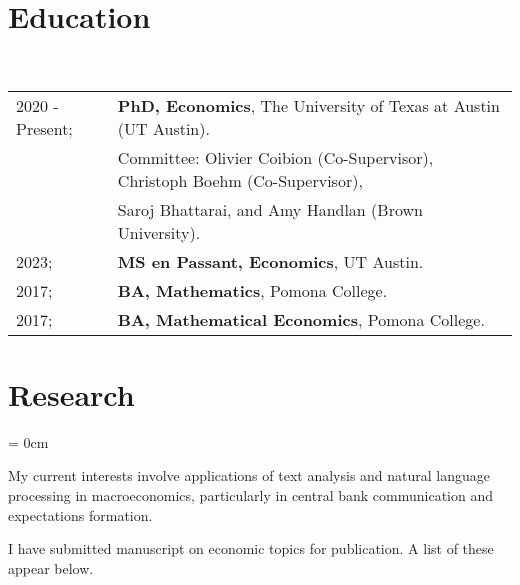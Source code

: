 \documentclass[a4paper, 10pt]{article}
\begin{document}
  \maketitle
  \thispagestyle{firststyle}
  \section{Education}
  ~\begin{tabular}{ll}
    2020 - Present; & \textbf{PhD, Economics}, The University of Texas at Austin (UT Austin).\\
    & Committee: Olivier Coibion (Co-Supervisor), Christoph Boehm (Co-Supervisor),\\
    & Saroj Bhattarai, and Amy Handlan (Brown University).\\
    2023; & \textbf{MS en Passant, Economics}, UT Austin.\\
    2017; & \textbf{BA, Mathematics}, Pomona College.\\
    2017; & \textbf{BA, Mathematical Economics}, Pomona College.\\
  \end{tabular}
  \vspace*{0.25em}

  \section{Research}
  \begin{compactitem}\parskip = 0cm
    \item My current interests involve applications of text analysis and natural language processing in macroeconomics, particularly in central bank communication and expectations formation.
    \item I have submitted  manuscript on economic topics for publication. A list of these appear below.
  \end{compactitem}
  \vspace*{0.25em}

  \begin{publications}
  \end{publications}
  \vspace*{-0.75em}
  \vspace*{-0.75em}
\end{document}
